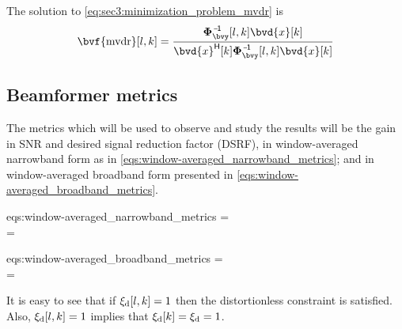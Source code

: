 The solution to \cref{eq:sec3:minimization_problem_mvdr} is
\begin{equation}
	\label{eq:sec3:solution_mvdr_beamformer}
	\bvf{\mvdr}[l,k] = \frac{ \inv{\Corr{\bvy}}[l,k] \bvd{x}[k] }{ \he{\bvd{x}}[k] \inv{\Corr{\bvy}}[l,k] \bvd{x}[k] }
\end{equation}

\subsection{Beamformer metrics}

The metrics which will be used to observe and study the results will be the gain in SNR and desired signal reduction factor (DSRF), in window-averaged narrowband form as in \cref{eqs:window-averaged_narrowband_metrics}; and in window-averaged broadband form presented in \cref{eqs:window-averaged_broadband_metrics}.

\begin{subgather}{eqs:window-averaged_narrowband_metrics}
	\gsnr[k] =  \div {} \\
	\dsrf[k] = 
\end{subgather}
\begin{subgather}{eqs:window-averaged_broadband_metrics}
	\gsnr =  \div {} \\
	\dsrf = 
\end{subgather}
It is easy to see that if $\xi_{\mathrm{d}}[l,k] = 1$ then the distortionless constraint is satisfied. Also, $\xi_{\mathrm{d}}[l,k] = 1$ implies that $\xi_{\mathrm{d}}[k] = \xi_{\mathrm{d}} = 1$.